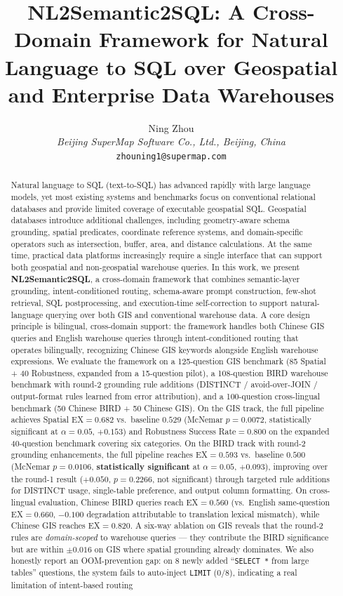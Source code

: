 \documentclass[11pt]{article}
\title{NL2Semantic2SQL: A Cross-Domain Framework for Natural Language to SQL over Geospatial and Enterprise Data Warehouses}
\author{Ning Zhou \\ \textit{Beijing SuperMap Software Co., Ltd., Beijing, China} \\ \texttt{zhouning1@supermap.com}}
\date{}
\begin{document}
\maketitle

\begin{abstract}
Natural language to SQL (text-to-SQL) has advanced rapidly with large language models, yet most existing systems and benchmarks focus on conventional relational databases and provide limited coverage of executable geospatial SQL. Geospatial databases introduce additional challenges, including geometry-aware schema grounding, spatial predicates, coordinate reference systems, and domain-specific operators such as intersection, buffer, area, and distance calculations. At the same time, practical data platforms increasingly require a single interface that can support both geospatial and non-geospatial warehouse queries. In this work, we present \textbf{NL2Semantic2SQL}, a cross-domain framework that combines semantic-layer grounding, intent-conditioned routing, schema-aware prompt construction, few-shot retrieval, SQL postprocessing, and execution-time self-correction to support natural-language querying over both GIS and conventional warehouse data. A core design principle is bilingual, cross-domain support: the framework handles both Chinese GIS queries and English warehouse queries through intent-conditioned routing that operates bilingually, recognizing Chinese GIS keywords alongside English warehouse expressions. We evaluate the framework on a 125-question GIS benchmark (85 Spatial + 40 Robustness, expanded from a 15-question pilot), a 108-question BIRD warehouse benchmark with round-2 grounding rule additions (DISTINCT / avoid-over-JOIN / output-format rules learned from error attribution), and a 100-question cross-lingual benchmark (50 Chinese BIRD + 50 Chinese GIS). On the GIS track, the full pipeline achieves Spatial EX$=0.682$ vs.\ baseline $0.529$ (McNemar $p=0.0072$, statistically significant at $\alpha=0.05$, $+0.153$) and Robustness Success Rate$=0.800$ on the expanded 40-question benchmark covering six categories. On the BIRD track with round-2 grounding enhancements, the full pipeline reaches EX$=0.593$ vs.\ baseline $0.500$ (McNemar $p=0.0106$, \textbf{statistically significant} at $\alpha=0.05$, $+0.093$), improving over the round-1 result ($+0.050$, $p=0.2266$, not significant) through targeted rule additions for DISTINCT usage, single-table preference, and output column formatting. On cross-lingual evaluation, Chinese BIRD queries reach EX$=0.560$ (vs.\ English same-question EX$=0.660$, $-0.100$ degradation attributable to translation lexical mismatch), while Chinese GIS reaches EX$=0.820$. A six-way ablation on GIS reveals that the round-2 rules are \emph{domain-scoped} to warehouse queries --- they contribute the BIRD significance but are within $\pm 0.016$ on GIS where spatial grounding already dominates. We also honestly report an OOM-prevention gap: on 8 newly added ``\texttt{SELECT *} from large tables'' questions, the system fails to auto-inject \texttt{LIMIT} ($0/8$), indicating a real limitation of intent-based routing 
\end{abstract}
\end{document}
